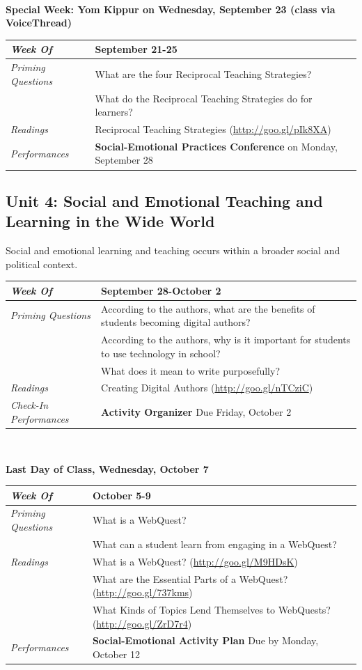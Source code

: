 \documentclass{tufte-handout}
\newcommand{\gentopic}[1]{\begin{fullwidth}\begin{center}\faKey \textsf{#1}\end{center}\end{fullwidth}}
\newcommand{\tabpq}{\faQuestionSign\medspace\textit{Priming Questions}}
\newcommand{\tabread}{\faBook\medspace\textit{Readings}}
\newcommand{\tabperformance}{\faTasks\medspace\textit{Performances}}
\newcommand{\tabdt}{\faCalendar\medspace\textit{Week Of}}
\newcommand{\tabcheckin}{\faPagelines\medspace\textit{Check-In Performances}}
\newcommand{\tabbreak}{\begin{fullwidth}\begin{center}\faAsterisk\faAsterisk\faAsterisk\\\end{center}\end{fullwidth}}
\newcommand{\specialweek}[1]{\begin{fullwidth}\begin{center}\textbf{\faBullhorn\medspace Special Week: #1 \medspace\faBullhorn}\end{center}\end{fullwidth}}
\newenvironment{tabsched}
	{\small
	\begin{tabular}{p{1.5in}p{4.5in}}
	\midrule}
	{\midrule
	\end{tabular}
	\normalsize}
\newcommand{\weeksix}{September 21-25}
\newcommand{\weekseven}{September 28-October 2}
\newcommand{\weekeight}{October 5-9}
\newcommand{\yomkippur}{Yom Kippur on Wednesday, September 23 (class via VoiceThread)}
\newcommand{\finisemester}{\begin{fullwidth}\begin{center}\large\textbf{\faFlagCheckered Last Day of Class, Wednesday, October 7 \faFlagCheckered}\normalsize\end{center}\end{fullwidth}}
\begin{document}
\tabbreak

\specialweek{\yomkippur}

\begin{tabsched}
	\tabdt & \weeksix \\
	\midrule
	\tabpq & What are the four Reciprocal Teaching Strategies? \\
	& What do the Reciprocal Teaching Strategies do for learners? \\
	\midrule
	\tabread & Reciprocal Teaching Strategies (\url{http://goo.gl/pIk8XA}) \\
	\midrule
	\tabperformance & \textbf{Social-Emotional Practices Conference} on Monday, September 28 \\
\end{tabsched}

\begin{fullwidth}
	\section{Unit 4: Social and Emotional Teaching and Learning in the Wide World}
\end{fullwidth}

\gentopic{Social and emotional learning and teaching occurs within a broader social and political context.}

\begin{tabsched}
	\tabdt & \weekseven \\
	\midrule
	\tabpq & According to the authors, what are the benefits of students becoming digital authors? \\
	& According to the authors, why is it important for students to use technology in school? \\
	& What does it mean to write purposefully? \\
	\midrule
	\tabread & Creating Digital Authors (\url{http://goo.gl/nTCziC}) \\
	\tabcheckin & \textbf{Activity Organizer} Due Friday, October 2 \\
\end{tabsched}

\tabbreak

\newpage

\finisemester

\begin{tabsched}
	\tabdt & \weekeight \\
	\midrule
	\tabpq & What is a WebQuest? \\
	& What can a student learn from engaging in a WebQuest? \\
	\midrule
	\tabread &  What is a WebQuest? (\url{http://goo.gl/M9HDsK}) \\
	& What are the Essential Parts of a WebQuest? (\url{http://goo.gl/737kms}) \\
	& What Kinds of Topics Lend Themselves to WebQuests? (\url{http://goo.gl/ZrD7r4}) \\
	\midrule
	\tabperformance & \textbf{Social-Emotional Activity Plan} Due by Monday, October 12 \\
\end{tabsched}
\end{document}
